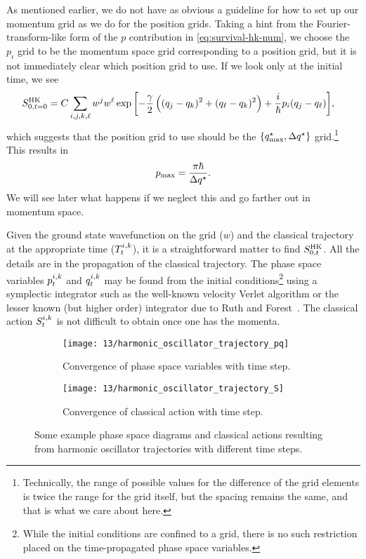 As mentioned earlier, we do not have as obvious a guideline for how to set up our momentum grid as we do for the position grids.
Taking a hint from the Fourier-transform-like form of the $p$ contribution in \cref{eq:survival-hk-num}, we choose the $p_i$ grid to be the momentum space grid corresponding to a position grid, but it is not immediately clear which position grid to use.
If we look only at the initial time, we see
\begin{align}
	S_{0,t=0}^\mathrm{HK}
	&= C \sum_{i,j,k,\ell}
			w^j w^\ell
			\exp{\left[ 
				-\frac{\gamma}{2} \left( (q_j - q_k)^2 + (q_\ell - q_k)^2 \right)
				+ \frac{i}{\hbar} p_i (q_j - q_\ell)
			 \right]},
\end{align}
which suggests that the position grid to use should be the $\{ q_\mathrm{max}^\star, \Delta q^\star \}$ grid.\footnote{
	Technically, the range of possible values for the difference of the grid elements is twice the range for the grid itself, but the spacing remains the same, and that is what we care about here.
}
This results in~\cite{fattal1996phase}
\begin{align}
	p_\mathrm{max}
	= \frac{\pi \hbar}{\Delta q^\star}.
		\label{eq:hk-pmax}
\end{align}
We will see later what happens if we neglect this and go farther out in momentum space.

Given the ground state wavefunction on the grid ($w$) and the classical trajectory at the appropriate time ($T^{i,k}_t$), it is a straightforward matter to find $S_{0,t}^\mathrm{HK}$.
All the details are in the propagation of the classical trajectory.
The phase space variables $p^{i,k}_t$ and $q^{i,k}_t$ may be found from the initial conditions\footnote{
	While the initial conditions are confined to a grid, there is no such restriction placed on the time-propagated phase space variables.
} using a symplectic integrator such as the well-known velocity Verlet algorithm or the lesser known (but higher order) integrator due to Ruth and Forest~\cite{forest1990fourth}.
The classical action $S^{i,k}_t$ is not difficult to obtain once one has the momenta.

\begin{figure}
	\setlength{\figspacing}{5 mm}
	\centering
	\begin{subfigure}[b]{\textwidth}
		\texttt{[image: 13/harmonic\_oscillator\_trajectory\_pq]}
		\caption{
			Convergence of phase space variables with time step.
		}
		\vspace{\figspacing}
	\end{subfigure}
	\begin{subfigure}[b]{\textwidth}
		\texttt{[image: 13/harmonic\_oscillator\_trajectory\_S]}
		\caption{
			Convergence of classical action with time step.
		}
	\end{subfigure}
	\caption[
		Example classical trajectories for harmonic oscillator
	]{
		Some example phase space diagrams and classical actions resulting from harmonic oscillator trajectories with different time steps.
		\explainplotsas{}
	}
	\label{fig:harmonic-oscillator-trajectory-a}
\end{figure}

